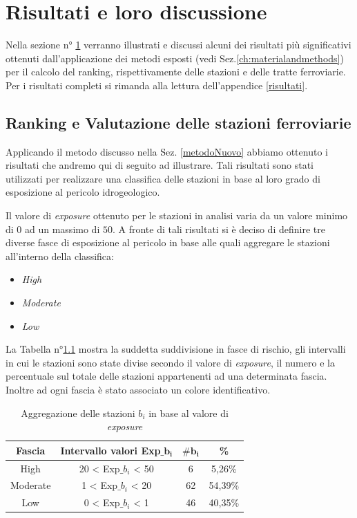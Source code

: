 \chapter{Risultati e loro discussione} 
\label{ch:risultatiediscussione} 

Nella sezione n° \ref{ch:risultatiediscussione} verranno illustrati e discussi alcuni dei risultati più significativi ottenuti dall'applicazione dei metodi esposti (vedi Sez.\ref{ch:materialandmethods}) per il calcolo del ranking, rispettivamente delle stazioni e delle tratte ferroviarie.
Per i risultati completi si rimanda alla lettura dell'appendice \ref{risultati}.
\section{Ranking e  Valutazione delle stazioni ferroviarie}

Applicando il metodo discusso nella Sez. \ref{metodoNuovo} abbiamo ottenuto i risultati che andremo qui di seguito ad illustrare.
Tali risultati sono stati utilizzati per realizzare una classifica delle stazioni in base al loro grado di esposizione al pericolo idrogeologico.


Il valore di \textit{exposure} ottenuto per le stazioni in analisi  varia da un valore minimo di $0$ ad un massimo di $50$. A fronte di tali risultati si è deciso di definire tre diverse fasce di esposizione al pericolo in base alle quali aggregare le stazioni all'interno della classifica:
\begin{itemize}
\item \textit{High}
\item \textit{Moderate}
\item \textit{Low}
\end{itemize}
La Tabella n°\ref{range} mostra la suddetta suddivisione in fasce di rischio, gli intervalli in cui le stazioni sono state divise secondo il valore di \textit{exposure}, il numero e la percentuale sul totale delle stazioni appartenenti ad una determinata fascia. Inoltre ad ogni fascia è stato associato un colore identificativo.
\begin{table}[h]
\centering
\begin{tabular}{|c|c|c|c|}
\hline
\rowcolor{lightgray}
\textbf{Fascia} & \textbf{Intervallo valori Exp$\mathbf{\_}$$\mathbf{b_i}$} & $\mathbf{\#b_i}$ & \textbf{\%} \\
\hline
\rowcolor{flamingopink}
High & 20 < Exp$\_$$b_i$ < 50 & 6 & 5,26\%\\
\hline
\rowcolor{icterine}
Moderate & 1 < Exp$\_$$b_i$ < 20 & 62 & 54,39\%\\
\hline
\rowcolor{inchworm}
Low & $0$ < Exp$\_$$b_i$ < 1 & 46 & 40,35\%\\
\hline
\end{tabular}
\caption{Aggregazione delle stazioni $b_i$ in base al valore di \textit{exposure} }
\label{range}
\end{table}

